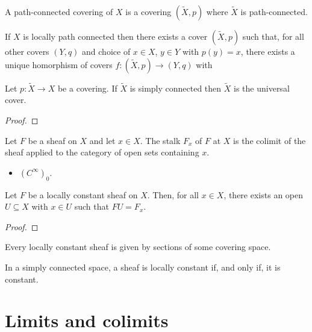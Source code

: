 \documentclass{article}
\begin{document}
\begin{definition}
  A path-connected covering of $X$ is a covering $(\tilde X,p)$ where $\tilde X$ is
  path-connected.
\end{definition}

\begin{theorem}
  If $X$ is locally path connected then there exists a cover
  $(\tilde X,p)$ such that, for all other covers $(Y,q)$ and choice of $x\in X$, $y\in Y$
  with $p(y)=x$, there exists a unique homorphism of covers $f:(\tilde X,p)\to(Y,q)$
  with \missingdef
\end{theorem}

\begin{theorem}
  Let $p:\tilde X\to X$ be a covering. If $\tilde X$ is simply connected then
  $\tilde X$ is the universal cover.
  \begin{proof}
    \missingproof
  \end{proof}
\end{theorem}

\begin{definition}
  Let $F$ be a sheaf on $X$ and let $x\in X$. The stalk $F_x$ of $F$ at $X$ is the
  colimit of the sheaf applied to the category of open sets containing $x$.
\end{definition}

\begin{example}
  \begin{itemize}
    \item $(C^\infty)_0$.
  \end{itemize}
\end{example}

\begin{lemma}
  Let $F$ be a locally constant sheaf on $X$. Then, for all $x\in X$, there exists
  an open $U\subseteq X$ with $x\in U$ such that $FU=F_x$.
  \begin{proof}
    \missingproof
  \end{proof}
\end{lemma}

\begin{theorem}
  Every locally constant sheaf is given by sections of some covering space.
\end{theorem}

\begin{theorem}
  In a simply connected space, a sheaf is locally constant if, and only if,
  it is constant.
\end{theorem}

\section{Limits and colimits}
\end{document}
